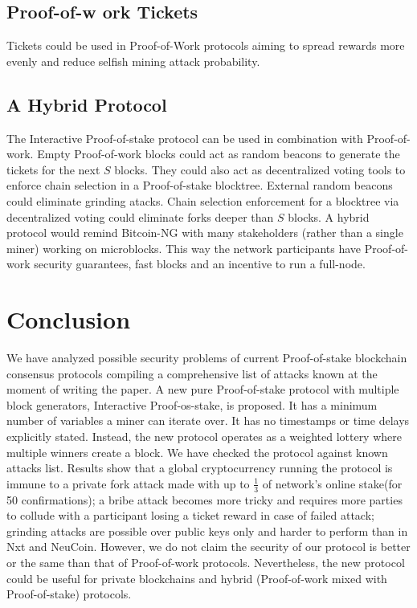 \documentclass[preprint,review,3p,times,twocolumn]{elsarticle}
\begin{document}
\subsection{Proof-of-w ork Tickets}

Tickets could be used in Proof-of-Work protocols aiming to spread rewards more evenly and reduce selfish mining attack\cite{Eyal2014} probability.

\subsection{A Hybrid Protocol}

The Interactive Proof-of-stake protocol can be used in combination with Proof-of-work. Empty Proof-of-work blocks could act as random beacons\cite{Bonneau2014} to generate the tickets for the next \(S\) blocks. They could also act as decentralized voting tools to enforce chain selection in a Proof-of-stake blocktree. External random beacons could eliminate grinding atacks. Chain selection enforcement for a blocktree via decentralized voting could eliminate forks deeper than \(S\) blocks. A hybrid protocol would remind Bitcoin-NG\cite{Renesse} with many stakeholders (rather than a single miner) working on microblocks. This way the network participants have Proof-of-work security guarantees, fast blocks and an incentive to run a full-node.

\section{Conclusion}
\label{s_conclusion}

We have analyzed possible security problems of current Proof-of-stake blockchain consensus protocols compiling a comprehensive list of attacks known at the moment of writing the paper. A new pure Proof-of-stake protocol with multiple block generators, Interactive Proof-os-stake, is proposed. It has a minimum number of variables a miner can iterate over. It has no timestamps or time delays explicitly stated. Instead, the new protocol operates as a weighted lottery where multiple winners create a block. We have checked the protocol against known attacks list. Results show that a global cryptocurrency running the protocol is immune to a private fork attack made with up to \(\frac{1}{3}\) of network's online stake(for 50 confirmations); a bribe attack becomes more tricky and requires more parties to collude with a participant losing a ticket reward in case of failed attack; grinding attacks are possible over public keys only and harder to perform than in Nxt and NeuCoin. However, we do not claim the security of our protocol is better or the same than that of Proof-of-work protocols. Nevertheless, the new protocol could be useful for private blockchains and hybrid (Proof-of-work mixed with Proof-of-stake) protocols.
\end{document}
